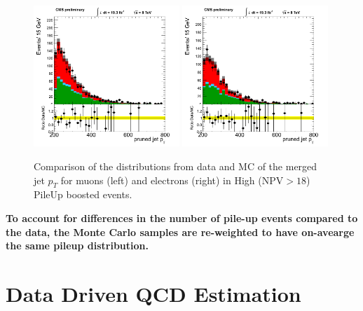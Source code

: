 \begin{figure}[h!t]
  {\centering
    \includegraphics[width=0.49\textwidth]{figs/puchecks/mu_HighNPV_GroomedJet_pt_pr.png}
    \includegraphics[width=0.49\textwidth]{figs/puchecks/el_HighNPV_GroomedJet_pt_pr.png}
    \caption{Comparison of the distributions from data and MC of the
    merged jet $p_T$ for muons (left) and electrons (right)
    in High (NPV$>18$) PileUp boosted events.}
\label{fig:pu_mergedjetptHigh}}
\end{figure}

{\bf To account for differences in the number of pile-up events 
compared to the data, the Monte Carlo samples are re-weighted to 
have on-avearge the same pileup distribution.}


\section{Data Driven QCD Estimation}
\label{sec:qcd}

